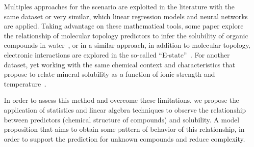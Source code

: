 Multiples approaches for the scenario are exploited in the literature with the same dataset or very similar, which linear regression models and neural networks are applied. Taking advantage on these mathematical tools, some paper explore the relationship of molecular topology predictors to infer the solubility of organic compounds in water~\cite{Artigo1}, or in a similar approach, in addition to molecular topology, electronic interactions are explored in the so-called ``E-state''~\cite{Artigo2}. For another dataset, yet working with the same chemical context and characteristics that propose to relate mineral solubility as a function of ionic strength and temperature~\cite{Artigo3}. 

In order to assess this method and overcome these limitations, we propose the application of statistics and linear algebra techniques to observe the relationship between predictors (chemical structure of compounds) and solubility. A model proposition that aims to obtain some pattern of behavior of this relationship, in order to support the prediction for unknown compounds and reduce complexity. 